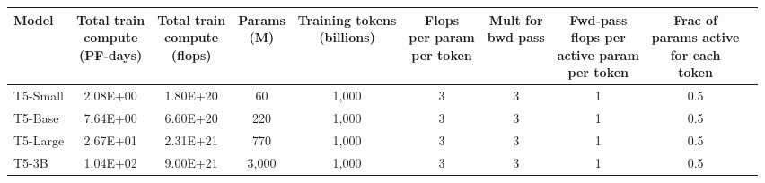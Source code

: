 
\begin{table}[!h]

\begin{adjustwidth}{-.6in}{-.6in}
{
    \tiny
    \centering
        \footnotesize
        \begin{center}
            \begin{tabular}{lccccccccc}
                     Model & \shortstack{Total train\\ compute \\ (PF-days)} & \shortstack{Total train \\compute \\ (flops)} & \shortstack{Params \\(M)} & \shortstack{Training tokens\\ (billions)} & \shortstack{Flops \\ per param \\ per token} & \shortstack{Mult for\\ bwd pass} & \shortstack{Fwd-pass \\ flops per \\ active param \\ per token} & \shortstack{Frac of\\ params active\\ for each\\ token} \\
            \midrule
                  T5-Small &                      2.08E+00 &                    1.80E+20 &         60 &                      1,000 &                               3 &                       3 &                                         1 &                                      0.5 &   \\
                   T5-Base &                      7.64E+00 &                    6.60E+20 &        220 &                      1,000 &                               3 &                       3 &                                         1 &                                      0.5 &   \\
                  T5-Large &                      2.67E+01 &                    2.31E+21 &        770 &                      1,000 &                               3 &                       3 &                                         1 &                                      0.5 &   \\
                     T5-3B &                      1.04E+02 &                    9.00E+21 &      3,000 &                      1,000 &                               3 &                       3 &                                         1 &                                      0.5 &   \\

\end{tabular}
\end{center}}
\end{adjustwidth}
\end{table}
